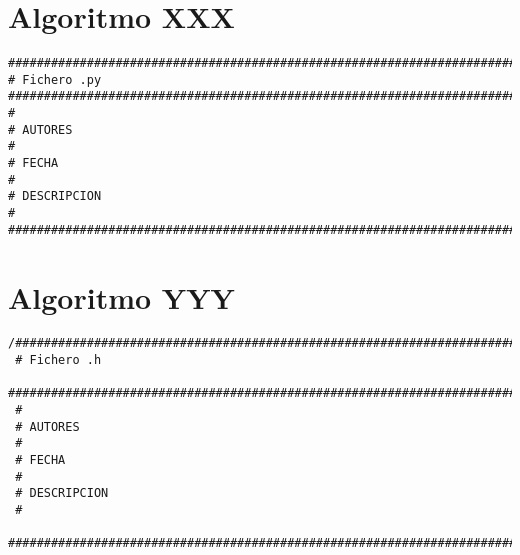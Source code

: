\section{Algoritmo XXX}
\label{Apendice1:XXX}

\begin{center}
\begin{footnotesize}
\begin{verbatim}
###################################################################################
# Fichero .py
###################################################################################
#
# AUTORES
#   
# FECHA
#
# DESCRIPCION
#
###################################################################################
\end{verbatim}
\end{footnotesize}
\end{center}

\section{Algoritmo YYY}
\label{Apendice1:YYY}

\begin{center}
\begin{footnotesize}
\begin{verbatim}
/###################################################################################
 # Fichero .h
 ###################################################################################
 #
 # AUTORES
 #
 # FECHA
 #
 # DESCRIPCION
 #
 ##################################################################################
\end{verbatim}
\end{footnotesize}
\end{center}
